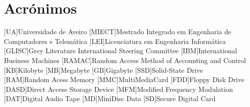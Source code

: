 \documentclass{report}
\begin{document}
\chapter*{Acrónimos}
\begin{acronym}
[UA]{Universidade de Aveiro}
[MIECT]{Mestrado Integrado em Engenharia de Computadores e Telemática}
[LEI]{Licenciatura em Engenharia Informática}
[GLISC]{Grey Literature International Steering Committee}
[IBM]{International Business Machines}
[RAMAC]{Random Access Method of Accounting and Control}
[KB]{Kilobyte}
[MB]{Megabyte}
[GB]{Gigabyte}
[SSD]{Solid-State Drive}
[RAM]{Random Acess Memory}
[MMC]{MultiMediaCard}
[FDD]{Floppy Disk Drive}
[DASD]{Direct Access Storage Device}
[MFM]{Modified Frequency Modulation}
[DAT]{Digital Audio Tape}
[MD]{MiniDisc Data}
[SD]{Secure Digital Card}
\end{acronym}


\printbibliography
\end{document}
